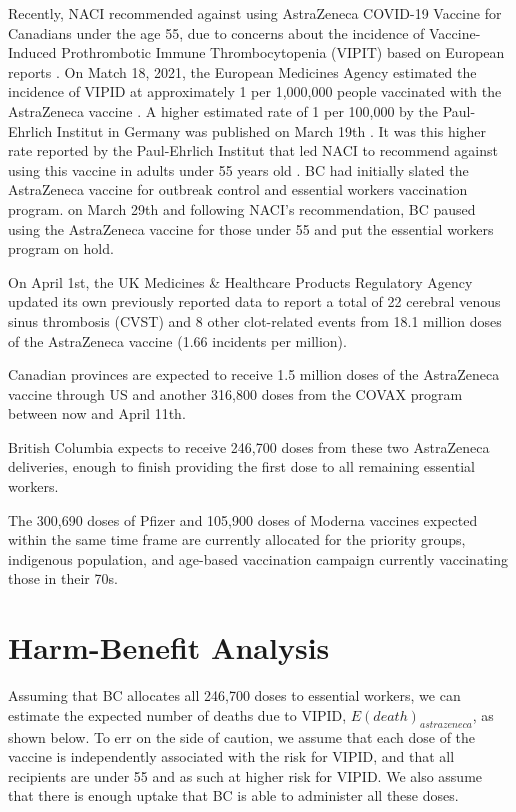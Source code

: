 \documentclass[]{interact}
\theoremstyle{plain}%
\theoremstyle{definition}
\theoremstyle{remark}
\begin{document}
Recently, NACI recommended against using AstraZeneca COVID-19 Vaccine
for Canadians under the age 55, due to concerns about the incidence of
Vaccine-Induced Prothrombotic Immune Thrombocytopenia (VIPIT) based on
European reports \citep{naci_naci_2021}. On Match 18, 2021, the European
Medicines Agency estimated the incidence of VIPID at approximately 1 per
1,000,000 people vaccinated with the AstraZeneca vaccine
\citep{ema_covid-19_2021}. A higher estimated rate of 1 per 100,000 by
the Paul-Ehrlich Institut in Germany was published on March 19th
\citep{pei_covid-19_2021}. It was this higher rate reported by the
Paul-Ehrlich Institut that led NACI to recommend against using this
vaccine in adults under 55 years old \citep{naci_naci_2021}. BC had
initially slated the AstraZeneca vaccine for outbreak control and
essential workers vaccination program. on March 29th and following
NACI's recommendation, BC paused using the AstraZeneca vaccine for those
under 55 and put the essential workers program on hold.

On April 1st, the UK Medicines \& Healthcare Products Regulatory Agency
updated its own previously reported data to report a total of 22
cerebral venous sinus thrombosis (CVST) and 8 other clot-related events
from 18.1 million doses of the AstraZeneca vaccine (1.66 incidents per
million).

Canadian provinces are expected to receive 1.5 million doses of the
AstraZeneca vaccine through US and another 316,800 doses from the COVAX
program between now and April 11th.

British Columbia expects to receive 246,700 doses from these two
AstraZeneca deliveries, enough to finish providing the first dose to all
remaining essential workers.

The 300,690 doses of Pfizer and 105,900 doses of Moderna vaccines
expected within the same time frame are currently allocated for the
priority groups, indigenous population, and age-based vaccination
campaign currently vaccinating those in their 70s.

\hypertarget{harm-benefit-analysis}{%
\section{Harm-Benefit Analysis}\label{harm-benefit-analysis}}

Assuming that BC allocates all 246,700 doses to essential workers, we
can estimate the expected number of deaths due to VIPID,
\(E(death)_{astrazeneca}\), as shown below. To err on the side of
caution, we assume that each dose of the vaccine is independently
associated with the risk for VIPID, and that all recipients are under 55
and as such at higher risk for VIPID. We also assume that there is
enough uptake that BC is able to administer all these doses.
\end{document}
